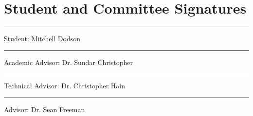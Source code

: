 \documentclass[11pt]{article}
\begin{document}
\section{Student and Committee Signatures}

{\centering

\vspace{3em}

\rule[4pt]{.66\linewidth}{.4pt}

\large{Student: Mitchell Dodson}

\vspace{3em}

\rule[4pt]{.66\linewidth}{.4pt}

\large{Academic Advisor: Dr. Sundar Christopher}

\vspace{3em}

\rule[4pt]{.66\linewidth}{.4pt}

\large{Technical Advisor: Dr. Christopher Hain}

\vspace{3em}

\rule[4pt]{.66\linewidth}{.4pt}

\large{Advisor: Dr. Sean Freeman}

}



\end{document}
